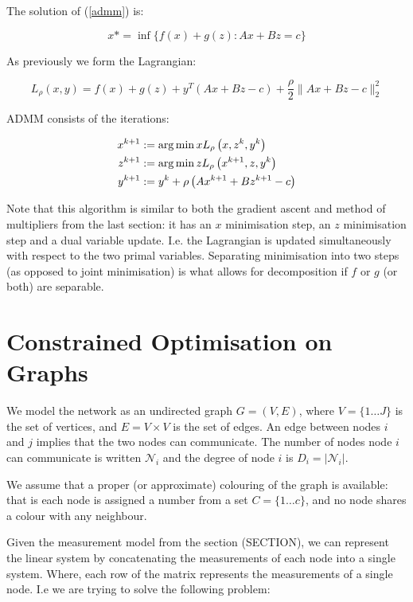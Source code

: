 The solution of (\ref{admm}) is:

\begin{equation}
x* = \inf\{f\left( x \right) + g\left(z\right) : Ax +Bz = c\}
\end{equation}

As previously we form the Lagrangian:

\begin{equation}
L_\rho\left(x,y\right) = f\left( x \right) + g\left(z\right) + y^T\left(Ax+Bz-c\right) + \frac{\rho}{2}\|Ax+Bz-c\|_2^2
\end{equation}

ADMM consists of the iterations:

\begin{align}
x^{k+1} &:= \operatorname*{arg\,min}{x} L_\rho\left(x,z^k,y^k\right)\\
z^{k+1} &:= \operatorname*{arg\,min}{z} L_\rho\left(x^{k+1},z,y^k\right)\\
y^{k+1} &:= y^{k} + \rho \left(Ax^{k+1} + Bz^{k+1} - c\right)
\label{admm_algo}
\end{align}

Note that this algorithm is similar to both the gradient ascent and method of multipliers from the last section: it has an \(x\) minimisation step, an \(z\) minimisation step and a dual variable update. I.e. the Lagrangian is updated simultaneously with respect to the two primal variables. Separating minimisation into two steps (as opposed to joint minimisation) is what allows for decomposition if \(f\) or \(g\) (or both) are separable. 

\section{Constrained Optimisation on Graphs}
We model the network as an undirected graph \(G = \left(V,E\right)\), where \(V = \{1 \ldots J\}\) is the set of vertices, and \(E = V \times V\) is the set of edges. An edge between nodes \(i\) and \(j\) implies that the two nodes can communicate. The number of nodes node \(i\) can communicate is written \(\mathcal{N}_i\) and the degree of node \(i\) is \(D_i = |\mathcal{N}_i|\). 

We assume that a proper (or approximate) colouring of the graph is available: that is each node is assigned a number from a set \(C = \{1 \ldots c \} \), and no node shares a colour with any neighbour.

Given the measurement model from the section (SECTION), we can represent the linear system by concatenating the measurements of each node into a single system. Where, each row of the matrix represents the measurements of a single node. I.e we are trying to solve the following problem:

